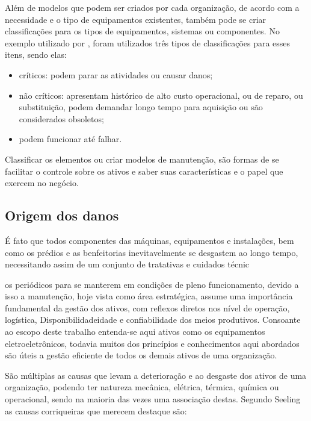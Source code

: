 Além de modelos que podem ser criados por cada organização, de acordo com a necessidade e o tipo de equipamentos existentes, também pode se criar classificações para os tipos de equipamentos, sistemas ou componentes. No exemplo utilizado por \cite{valeria2013}, foram utilizados três tipos de classificações para esses itens, sendo elas:

\begin{itemize}
	\item críticos: podem parar as atividades ou causar danos;
	\item não críticos: apresentam histórico de alto custo operacional, ou de reparo, ou substituição, podem demandar longo tempo para aquisição ou são considerados obsoletos;
	\item podem funcionar até falhar.
\end{itemize}

Classificar os elementos ou criar modelos de manutenção, são formas de se facilitar o controle sobre os ativos e saber suas características e o papel que exercem no negócio.

\subsection{Origem dos danos}

É fato que todos componentes das máquinas, equipamentos e instalações, bem como os prédios e as benfeitorias inevitavelmente se desgastem ao longo tempo, necessitando assim de um conjunto de tratativas e cuidados técnic

os periódicos para se manterem em condições de pleno funcionamento, devido a isso a manutenção, hoje vista como área estratégica, assume uma importância fundamental da gestão dos ativos, com reflexos diretos nos nível de operação, logística, Disponibilidadeidade e confiabilidade dos meios produtivos. Consoante ao escopo deste trabalho entenda-se aqui ativos como os equipamentos eletroeletrônicos, todavia muitos dos princípios e conhecimentos aqui abordados são úteis a gestão eficiente de todos os demais ativos de uma organização. 

São múltiplas as causas que levam a deterioração e ao desgaste dos ativos de uma organização, podendo ter natureza mecânica, elétrica, térmica, química ou operacional, sendo na maioria das vezes uma associação destas. Segundo Seeling \cite{seeling2000} as causas corriqueiras que merecem destaque são:

